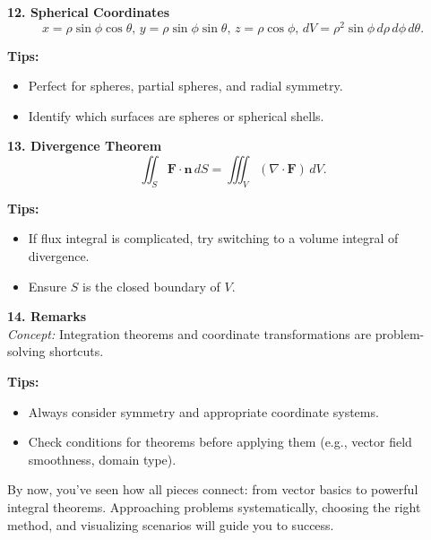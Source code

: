 \documentclass[9pt]{article}
\begin{document}
\begin{multicols}{2}
\begin{tcolorbox}[title=, colframe=brightyellow]
\textbf{12. Spherical Coordinates}\\
\[
x=\rho\sin\phi\cos\theta,\, y=\rho\sin\phi\sin\theta,\, z=\rho\cos\phi,\, dV=\rho^2\sin\phi\,d\rho\,d\phi\,d\theta.
\]

\textbf{Tips:}
\begin{itemize}
    \item Perfect for spheres, partial spheres, and radial symmetry.
    \item Identify which surfaces are spheres or spherical shells.
\end{itemize}
\end{tcolorbox}

\begin{tcolorbox}[title=, colframe=brightblue]
\textbf{13. Divergence Theorem}\\
\[
\iint_{S}\mathbf{F}\cdot\mathbf{n}\,dS=\iiint_{V}(\nabla \cdot \mathbf{F})\,dV.
\]

\textbf{Tips:}
\begin{itemize}
    \item If flux integral is complicated, try switching to a volume integral of divergence.
    \item Ensure $S$ is the closed boundary of $V$.
\end{itemize}
\end{tcolorbox}

\begin{tcolorbox}[title=, colframe=brightgreen]
\textbf{14. Remarks}\\
\textit{Concept:} Integration theorems and coordinate transformations are problem-solving shortcuts.

\textbf{Tips:}
\begin{itemize}
    \item Always consider symmetry and appropriate coordinate systems.
    \item Check conditions for theorems before applying them (e.g., vector field smoothness, domain type).
\end{itemize}
\end{tcolorbox}

\end{multicols}

\noindent By now, you've seen how all pieces connect: from vector basics to powerful integral theorems. Approaching problems systematically, choosing the right method, and visualizing scenarios will guide you to success.
\end{document}
